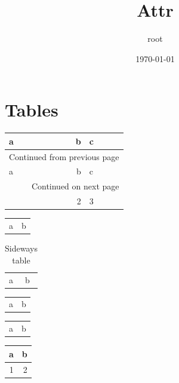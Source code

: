 \documentclass[11pt]{article}
\author{root}
\date{\today}
\title{Attr}
\begin{document}
\maketitle
\tableofcontents

\section{Tables}
\label{sec:orgaf83473}
\begin{longtable}{lrl}
a & b & c\\[0pt]
\hline
\endfirsthead
\multicolumn{3}{l}{Continued from previous page} \\[0pt]
\hline

a & b & c \\[0pt]

\hline
\endhead
\hline\multicolumn{3}{r}{Continued on next page} \\
\endfoot
\endlastfoot
\hline
1 & 2 & 3\\[0pt]
\end{longtable}

\begin{center}
\begin{tabularx}{\textwidth}{XX}
a & b\\[0pt]
\end{tabularx}
\end{center}

\begin{table}
\caption{Sideways table}
\centering
\begin{tabular}{ll}
a & b\\[0pt]
\end{tabular}
\end{table}

\begin{center}
\begin{tabular}{ll}
a & b\\[0pt]
\end{tabular}
\end{center}

\begin{tabular}{ll}
a & b\\[0pt]
\end{tabular}

\begin{center}
\begin{tabular}{rr}
\toprule
a & b\\[0pt]
\midrule
1 & 2\\[0pt]
\bottomrule
\end{tabular}
\end{center}
\end{document}
